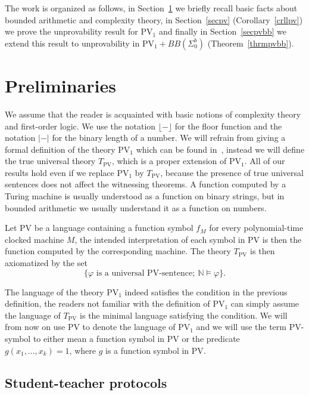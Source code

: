 \documentclass{lmcs}
\newcommand{\PV}{\text{PV}}
\newcommand{\abs}[1]{\lvert #1\rvert}
\newcommand{\floor}[1]{\lfloor #1\rfloor}
\newcommand{\NN}{\mathbb{N}}
\begin{document}
The work is organized as follows, in Section~\ref{secpreli} we briefly recall basic facts about bounded arithmetic and complexity theory, in Section~\ref{secpv} (Corollary~\ref{crllpv}) we prove the unprovability result for $\PV_1$ and finally in Section~\ref{secpvbb} we extend this result to unprovability in $\PV_1+BB(\Sigma^b_0)$ (Theorem~\ref{thrmpvbb}).

\section{Preliminaries}\label{secpreli}

We assume that the reader is acquainted with basic notions of complexity theory and first-order logic. We use the notation $\floor{-}$ for the floor function and the notation $\abs{-}$ for the binary length of a number. We will refrain from giving a formal definition of the theory $\PV_1$ which can be found in~\cite{krajicek1991bounded,krajicek1995bounded}, instead we will define the true universal theory $T_{\PV}$, which is a proper extension of $\PV_1$. All of our results hold even if we replace $\PV_1$ by $T_{\PV}$, because the presence of true universal sentences does not affect the witnessing theorems. A function computed by a Turing machine is usually understood as a function on binary strings, but in bounded arithmetic we usually understand it as a function on numbers.

\begin{defi}
    Let $\PV$ be a language containing a function symbol $f_M$ for every polynomial-time clocked machine $M$, the intended interpretation of each symbol in $\PV$ is then the function computed by the corresponding machine. The theory $T_{\PV}$ is then axiomatized by the set
    \[\{\varphi\text{ is a universal $\PV$-sentence}; \:\NN\models \varphi\}.\]
\end{defi}

The language of the theory $\PV_1$ indeed satisfies the condition in the previous definition, the readers not familiar with the definition of $\PV_1$ can simply assume the language of $T_{\PV}$ is the minimal language satisfying the condition. We will from now on use $\PV$ to denote the language of $\PV_1$ and we will use the term $\PV$-symbol to either mean a function symbol in $\PV$ or the predicate $g(x_1,\dots,x_k) = 1$, where $g$ is a function symbol in $\PV$.

\subsection{Student-teacher protocols}
\end{document}
